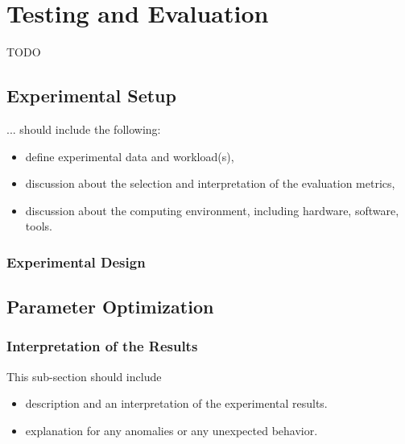 \chapter{Testing and Evaluation\label{cha:chapter5}}

TODO


\section{Experimental Setup\label{sec:exp}}
... should include the following:
\begin{itemize}

\item define experimental data and workload(s),
\item discussion about the selection and interpretation of the evaluation metrics,
\item discussion about the computing environment, including hardware, software, tools.
\end{itemize}

\subsection{Experimental Design}


\section{Parameter Optimization\label{sec:parameterOptimization}}


\subsection{Interpretation of the Results}
This sub-section should include
\begin{itemize}
\item 	description and an interpretation of the experimental results.
\item 	explanation for any anomalies or any unexpected behavior.
\end{itemize}

